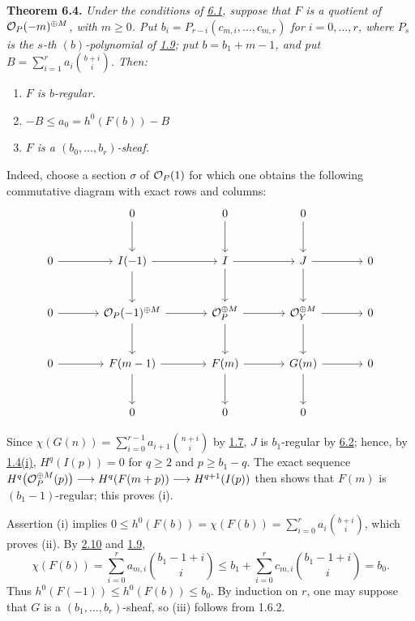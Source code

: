 \textbf{Theorem 6.4.} \emph{Under the conditions of \hyperlink{sga6.e13.para.6-1}{6.1}, suppose that
$F$ is a quotient of $\mathcal O_P(-m)^{\oplus M}$, with $m\geq0$. Put
$b_i=P_{r-i}(c_{m,i},\ldots,c_{m,r})$ for $i=0,\ldots,r$, where $P_s$
is the $s$-th $(b)$-polynomial of \hyperlink{sga6.e13.def.1-9}{1.9}; put $b=b_1+m-1$, and put
$B=\sum_{i=1}^{r}a_i\binom{b+i}{i}$. Then:}
\begin{enumerate}[label=(\roman*)]
\item \emph{$F$ is $b$-regular.}
\item \emph{$-B\leq a_0=h^0(F(b))-B$}
\item \emph{$F$ is a $(b_0,\ldots,b_r)$-sheaf.}
\end{enumerate}

Indeed, choose a section $\sigma$ of $\mathcal O_P(1)$ for which one obtains the following commutative diagram with exact rows and columns:
\[
\begin{tikzcd}[column sep=large,row sep=large]
&0 \arrow[d]&0 \arrow[d]&0 \arrow[d]&\\
0 \arrow[r]&I(-1) \arrow[r] \arrow[d]&I \arrow[r] \arrow[d]&J \arrow[r] \arrow[d]&0\\
0 \arrow[r]&\cO_P(-1)^{\oplus M} \arrow[r] \arrow[d]&\cO_P^{\oplus M} \arrow[r] \arrow[d]&\cO_Y^{\oplus M} \arrow[r] \arrow[d]&0\\
0 \arrow[r]&F(m-1) \arrow[r] \arrow[d]&F(m) \arrow[r] \arrow[d]&G(m) \arrow[r] \arrow[d]&0\\
&0&0&0&
\end{tikzcd}
\]

Since $\chi(G(n))=\sum_{i=0}^{r-1}a_{i+1}\binom{n+i}{i}$ by \hyperlink{sga6.e13.lem.1-7}{1.7},
$J$ is $b_1$-regular by \hyperlink{sga6.e13.lem.6-2}{6.2}; hence, by \hyperlink{sga6.e13.prop.1-4}{1.4(i)}, $H^q(I(p))=0$ for
$q\geq2$ and $p\geq b_1-q$. The exact sequence
$H^q\bigl(\mathcal O_P^{\oplus M}(p)\bigr)\longrightarrow
H^q(F(m+p))\longrightarrow H^{q+1}(I(p))$ then shows that $F(m)$ is
$(b_1-1)$-regular; this proves (i).

Assertion (i) implies
$0\leq h^0(F(b))=\chi(F(b))
=\sum_{i=0}^{r}a_i\binom{b+i}{i}$, which proves (ii). By \hyperlink{sga6.e13.rem.2-10}{2.10} and \hyperlink{sga6.e13.def.1-9}{1.9},
\[
  \chi(F(b))
  =\sum_{i=0}^{r}a_{m,i}\binom{b_1-1+i}{i}
  \leq b_1+\sum_{i=0}^{r}c_{m,i}\binom{b_1-1+i}{i}
  =b_0.
\]
Thus $h^0(F(-1))\leq h^0(F(b))\leq b_0$. By induction on $r$, one may suppose that $G$ is a $(b_1,\ldots,b_r)$-sheaf, so (iii) follows from 1.6.2.

